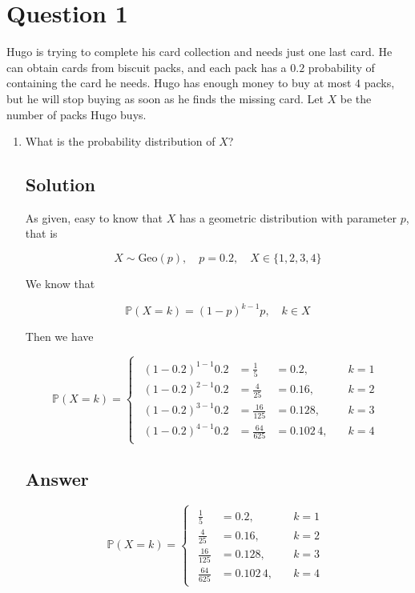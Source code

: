 \documentclass[12pt]{article}
\newcommand{\bP}{\mathbb{P}}
\begin{document}
	
	\section*{Question 1}
	
	\noindent Hugo is trying to complete his card collection and needs just one last card. He can obtain cards from biscuit packs, and each pack has a $0.2$ probability of containing the card he needs. Hugo has enough money to buy at most $4$ packs, but he will stop buying as soon as he finds the missing card. Let $X$ be the number of packs Hugo buys.
	
	\bigskip
	
	\begin{enumerate}[start=1,label={\bfseries Part \arabic*:},leftmargin=0in]
		\bigskip\item What is the probability distribution of $X$?
		
		\subsection*{Solution}
		
			As given, easy to know that $X$ has a geometric distribution with parameter $p$, that is
			
			\[X\sim\text{Geo}(p),\quad p = 0.2,\quad X \in \{1,2,3,4\}\]
			
			We know that
			
			\[\bP(X = k) = (1-p)^{k-1}p,\quad k\in X\]
			
			Then we have
			
			\[
				\bP(X = k) =
					\begin{cases}
						\begin{aligned}
							(1-0.2)^{1-1} 0.2 &= \frac{1}{5} &= 0.2, &\quad k = 1\\
							(1-0.2)^{2-1} 0.2 &= \frac{4}{25} &= 0.16, &\quad k = 2\\
							(1-0.2)^{3-1} 0.2 &= \frac{16}{125} &= 0.128, &\quad k = 3\\
							(1-0.2)^{4-1} 0.2 &= \frac{64}{625} &= 0.102\,4, &\quad k = 4
						\end{aligned}
					\end{cases}
			\]
		
		\subsection*{Answer}
		
			\[\boxed{\bP(X = k) =
				\begin{cases}
					\begin{aligned}
						\frac{1}{5} &= 0.2, &\quad k = 1\\
						\frac{4}{25} &= 0.16, &\quad k = 2\\
						\frac{16}{125} &= 0.128, &\quad k = 3\\
						\frac{64}{625} &= 0.102\,4, &\quad k = 4
					\end{aligned}
			\end{cases}}\]
		

\end{enumerate}
\end{document}
